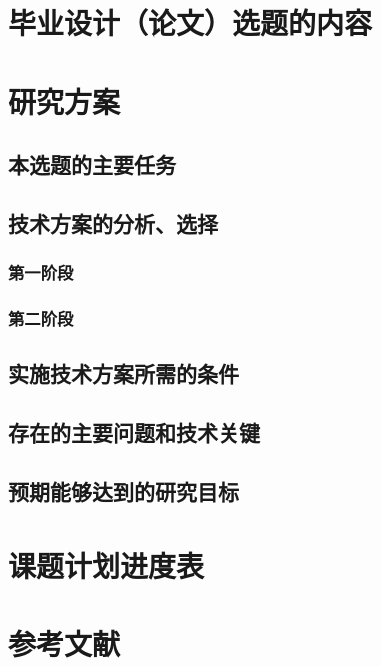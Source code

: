 \documentclass[UTF8,AutoFakeBold,AutoFakeSlant,12pt]{ctexart}
\begin{document}




\pagestyle{fancy}
\setcounter{page}{1}
\fancyhf{}
\fancyhead[R]{\fontsize{10.5pt}{10.5pt}\selectfont{北京理工大学本科生毕业设计（论文）开题报告}}
\fancyfoot[R]{\fontsize{9pt}{9pt}\selectfont{\thepage}}
\renewcommand{\headrulewidth}{1pt}
\renewcommand{\footrulewidth}{0pt}

\setlength{\parindent}{1.02cm}

\section{毕业设计（论文）选题的内容}
\lipsum[1]

\section{研究方案}
\subsection{本选题的主要任务}
\lipsum[2]

\subsection{技术方案的分析、选择}

\subsubsection{第一阶段}
\lipsum[3-4]

\subsubsection{第二阶段}
\lipsum[5]

\subsection{实施技术方案所需的条件}
\lipsum[6]

\subsection{存在的主要问题和技术关键}
\lipsum[7]

\subsection{预期能够达到的研究目标}
\lipsum[8]

\section{课题计划进度表}
\lipsum[9-10]

\section{参考文献}
\end{document}
